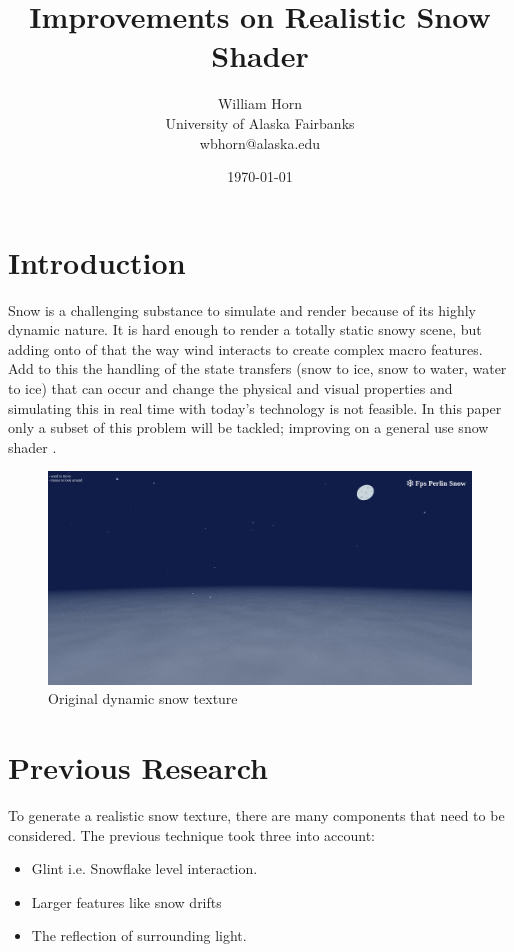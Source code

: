 \documentclass{IEEEtran}
\begin{document}
\title{Improvements on Realistic Snow Shader}
\author{William Horn\\University of Alaska Fairbanks\\wbhorn@alaska.edu}
\date{\today}
\maketitle

\section{Introduction}

Snow is a challenging substance to simulate and render because of its highly
dynamic nature. It is hard enough to render a totally static snowy scene, but
adding onto of that the way wind interacts to create complex macro features. Add
to this the handling of the state transfers (snow to ice, snow to water, water
to ice) that can occur and change the physical and visual properties and
simulating this in real time with today's technology is not feasible. In this
paper only a subset of this problem will be tackled; improving on a general use snow
shader .

\begin{figure}
    \includegraphics[width=\linewidth]{images/original.jpg}
    \caption{Original dynamic snow texture}
    \label{fig:original}
\end{figure}

\section{Previous Research}

To generate a realistic snow texture, there are many components that need to be
considered. The previous technique took three into account:
\begin{itemize}
    \item Glint i.e. Snowflake level interaction.
    \item Larger features like snow drifts
    \item The reflection of surrounding light.
\end{itemize}
\end{document}
